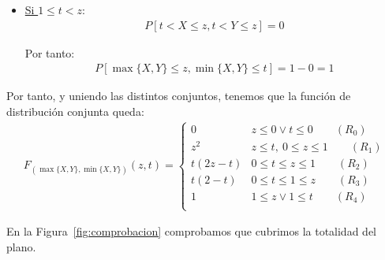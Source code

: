 \documentclass[12pt]{article}
\begin{document}
\begin{ejercicio}
\begin{enumerate}
\begin{itemize}
\begin{itemize}
\begin{itemize}
                        \item \ul{Si $1\leq t<z$}:
                        \begin{align*}
                            P[t<X\leq z,t<Y\leq z] = 0
                        \end{align*}

                        Por tanto:
                        \begin{align*}
                            P[\max\{X,Y\}\leq z, \min\{X,Y\}\leq t]
                            = 1- 0=1
                        \end{align*}
                    \end{itemize}
                \end{itemize}
            \end{itemize}

            Por tanto, y uniendo las distintos conjuntos, tenemos que la función de distribución conjunta queda:
            \begin{align*}
                F_{(\max\{X,Y\},\min\{X,Y\})}(z,t)
                = \begin{cases}
                    0 & z\leq 0 \lor t\leq 0 \qquad (R_0)\\
                    z^2 & z\leq t,~0\leq z\leq 1 \qquad (R_1)\\
                    t(2z-t) & 0\leq t\leq z\leq 1 \qquad (R_2)\\
                    t(2-t) & 0\leq t\leq 1\leq z \qquad (R_3)\\
                    1 & 1\leq z \lor 1\leq t \qquad (R_4)\\
                \end{cases}
            \end{align*}

            En la Figura~\ref{fig:comprobacion} comprobamos que cubrimos la totalidad del plano.
            \begin{figure}[H]
                \centering
\end{figure}
\end{enumerate}
\end{ejercicio}
\end{document}
